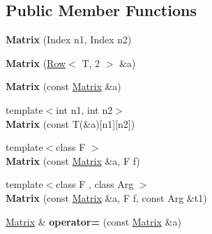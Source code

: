 \subsection*{Public Member Functions}
\begin{DoxyCompactItemize}
\item 
{\bfseries Matrix} (Index n1, Index n2)\hypertarget{classcpt_1_1Matrix_3_01T_00_012_01_4_a6f8f0600c2a7bedf431c45d72bffaccf}{}\label{classcpt_1_1Matrix_3_01T_00_012_01_4_a6f8f0600c2a7bedf431c45d72bffaccf}

\item 
{\bfseries Matrix} (\hyperlink{classcpt_1_1Row}{Row}$<$ T, 2 $>$ \&a)\hypertarget{classcpt_1_1Matrix_3_01T_00_012_01_4_a492fa92b0ba238e269c84935ae3b758b}{}\label{classcpt_1_1Matrix_3_01T_00_012_01_4_a492fa92b0ba238e269c84935ae3b758b}

\item 
{\bfseries Matrix} (const \hyperlink{classcpt_1_1Matrix}{Matrix} \&a)\hypertarget{classcpt_1_1Matrix_3_01T_00_012_01_4_a5ea17dd8599da071ef8e3132c8659c09}{}\label{classcpt_1_1Matrix_3_01T_00_012_01_4_a5ea17dd8599da071ef8e3132c8659c09}

\item 
{\footnotesize template$<$int n1, int n2$>$ }\\{\bfseries Matrix} (const T(\&a)\mbox{[}n1\mbox{]}\mbox{[}n2\mbox{]})\hypertarget{classcpt_1_1Matrix_3_01T_00_012_01_4_a80bccec41db1cb48294ed85d1f8f7f3d}{}\label{classcpt_1_1Matrix_3_01T_00_012_01_4_a80bccec41db1cb48294ed85d1f8f7f3d}

\item 
{\footnotesize template$<$class F $>$ }\\{\bfseries Matrix} (const \hyperlink{classcpt_1_1Matrix}{Matrix} \&a, F f)\hypertarget{classcpt_1_1Matrix_3_01T_00_012_01_4_a41c880707d7afaba02793f4863000d92}{}\label{classcpt_1_1Matrix_3_01T_00_012_01_4_a41c880707d7afaba02793f4863000d92}

\item 
{\footnotesize template$<$class F , class Arg $>$ }\\{\bfseries Matrix} (const \hyperlink{classcpt_1_1Matrix}{Matrix} \&a, F f, const Arg \&t1)\hypertarget{classcpt_1_1Matrix_3_01T_00_012_01_4_a8ca78740b41b0b4934bfd1a81ef01d2b}{}\label{classcpt_1_1Matrix_3_01T_00_012_01_4_a8ca78740b41b0b4934bfd1a81ef01d2b}

\item 
\hyperlink{classcpt_1_1Matrix}{Matrix} \& {\bfseries operator=} (const \hyperlink{classcpt_1_1Matrix}{Matrix} \&a)\hypertarget{classcpt_1_1Matrix_3_01T_00_012_01_4_ad24c195b00fee636f132dc19188abcf4}{}\label{classcpt_1_1Matrix_3_01T_00_012_01_4_ad24c195b00fee636f132dc19188abcf4}


\end{DoxyCompactItemize}
